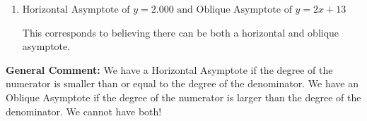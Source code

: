 \documentclass{extbook}[14pt]
\begin{document}
\begin{enumerate}
{\begin{enumerate}[label=\Alph*.]
This corresponds to flipping the numerator and denominator, then using synthetic division to find the oblique asymptote.
\item \( \text{Horizontal Asymptote of } y = 2.000 \text{ and Oblique Asymptote of } y = 2x + 13 \)

This corresponds to believing there can be both a horizontal and oblique asymptote.
\end{enumerate}

\textbf{General Comment:} We have a Horizontal Asymptote if the degree of the numerator is smaller than or equal to the degree of the denominator. We have an Oblique Asymptote if the degree of the numerator is larger than the degree of the denominator. We cannot have both!
}
\end{enumerate}
\end{document}
